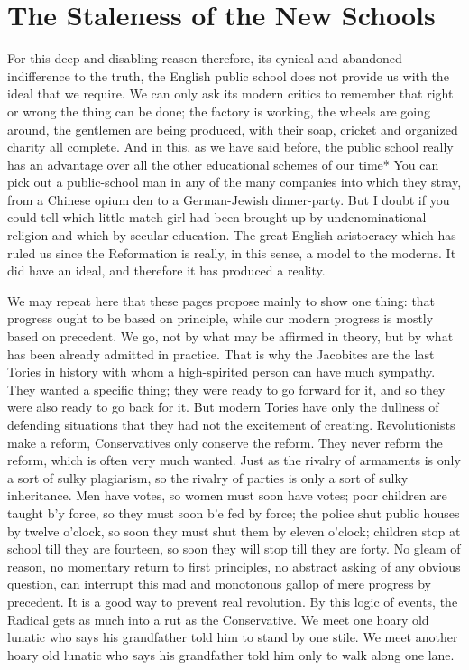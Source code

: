 \documentclass{book}
\begin{document}
\chapter{The Staleness of the New Schools}
\label{chapter-43}
For this deep and disabling reason therefore, its cynical and abandoned indifference to the truth, the English public school does not provide us with the ideal that we require. We can only ask its modern critics to remember that right or wrong the thing can be done; the factory is working, the wheels are going around, the gentlemen are being produced, with their soap, cricket and organized charity all complete. And in this, as we have said before, the public school really has an advantage over all the other educational schemes of our time* You can pick out a public-school man in any of the many companies into which they stray, from a Chinese opium den to a German-Jewish dinner-party. But I doubt if you could tell which little match girl had been brought up by undenominational religion and which by secular education. The great English aristocracy which has ruled us since the Reformation is really, in this sense, a model to the moderns. It did have an ideal, and therefore it has produced a reality.

We may repeat here that these pages propose mainly to show one thing: that progress ought to be based on principle, while our modern progress is mostly based on precedent. We go, not by what may be affirmed in theory, but by what has been already admitted in practice. That is why the Jacobites are the last Tories in history with whom a high-spirited person can have much sympathy. They wanted a specific thing; they were ready to go forward for it, and so they were also ready to go back for it. But modern Tories have only the dullness of defending situations that they had not the excitement of creating. Revolutionists make a reform, Conservatives only conserve the reform. They never reform the reform, which is often very much wanted. Just as the rivalry of armaments is only a sort of sulky plagiarism, so the rivalry of parties is only a sort of sulky inheritance. Men have votes, so women must soon have votes; poor children are taught b’y force, so they must soon b’e fed by force; the police shut public houses by twelve o’clock, so soon they must shut them by eleven o’clock; children stop at school till they are fourteen, so soon they will stop till they are forty. No gleam of reason, no momentary return to first principles, no abstract asking of any obvious question, can interrupt this mad and monotonous gallop of mere progress by precedent. It is a good way to prevent real revolution. By this logic of events, the Radical gets as much into a rut as the Conservative. We meet one hoary old lunatic who says his grandfather told him to stand by one stile. We meet another hoary old lunatic who says his grandfather told him only to walk along one lane.
\end{document}
